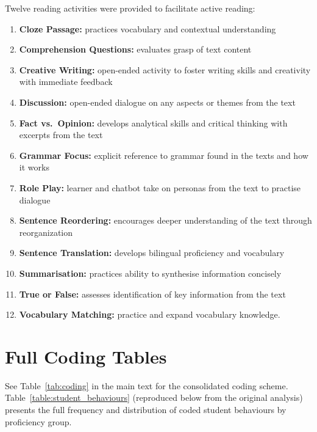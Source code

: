 Twelve reading activities were provided to facilitate active reading:
\begin{enumerate}
    \item \textbf{Cloze Passage:} practices vocabulary and contextual understanding
    \item \textbf{Comprehension Questions:} evaluates grasp of text content
    \item \textbf{Creative Writing:} open-ended activity to foster writing skills and creativity with immediate feedback
    \item \textbf{Discussion:} open-ended dialogue on any aspects or themes from the text
    \item \textbf{Fact vs.\ Opinion:} develops analytical skills and critical thinking with excerpts from the text
    \item \textbf{Grammar Focus:} explicit reference to grammar found in the texts and how it works
    \item \textbf{Role Play:} learner and chatbot take on personas from the text to practise dialogue
    \item \textbf{Sentence Reordering:} encourages deeper understanding of the text through reorganization
    \item \textbf{Sentence Translation:} develops bilingual proficiency and vocabulary
    \item \textbf{Summarisation:} practices ability to synthesise information concisely
    \item \textbf{True or False:} assesses identification of key information from the text
    \item \textbf{Vocabulary Matching:} practice and expand vocabulary knowledge.
\end{enumerate}

\section{Full Coding Tables}
\label{app:coding_tables}

See Table~\ref{tab:coding} in the main text for the consolidated coding scheme. Table~\ref{table:student_behaviours} (reproduced below from the original analysis) presents the full frequency and distribution of coded student behaviours by proficiency group.

